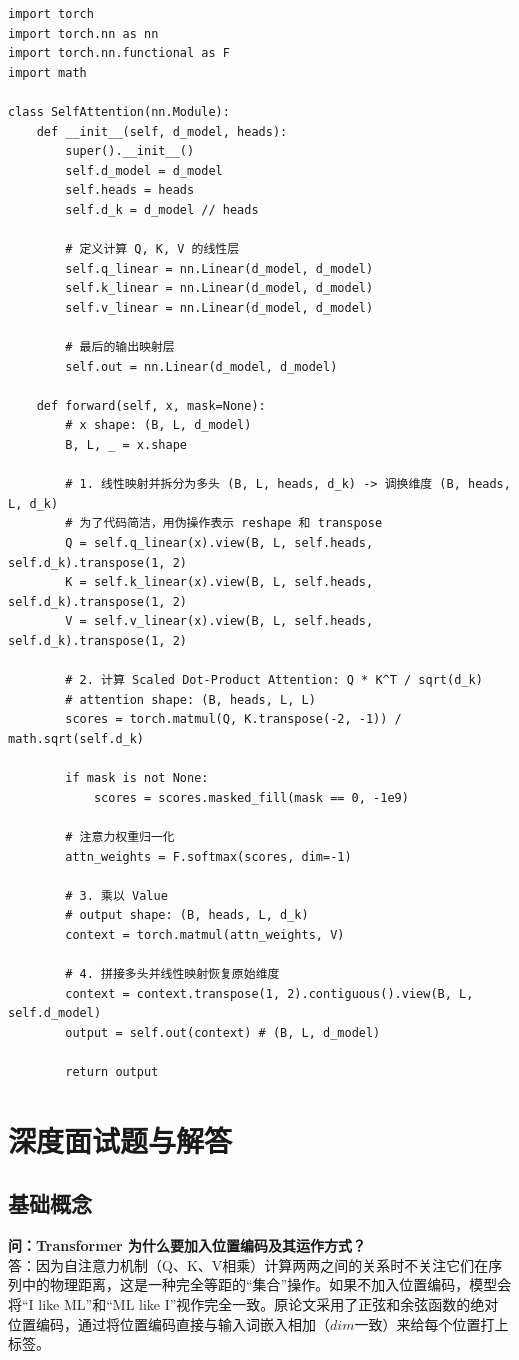 \documentclass[12pt, a4paper]{article}
\begin{document}
\begin{lstlisting}
import torch
import torch.nn as nn
import torch.nn.functional as F
import math

class SelfAttention(nn.Module):
    def __init__(self, d_model, heads):
        super().__init__()
        self.d_model = d_model
        self.heads = heads
        self.d_k = d_model // heads
        
        # 定义计算 Q, K, V 的线性层
        self.q_linear = nn.Linear(d_model, d_model)
        self.k_linear = nn.Linear(d_model, d_model)
        self.v_linear = nn.Linear(d_model, d_model)
        
        # 最后的输出映射层
        self.out = nn.Linear(d_model, d_model)
        
    def forward(self, x, mask=None):
        # x shape: (B, L, d_model)
        B, L, _ = x.shape
        
        # 1. 线性映射并拆分为多头 (B, L, heads, d_k) -> 调换维度 (B, heads, L, d_k)
        # 为了代码简洁，用伪操作表示 reshape 和 transpose
        Q = self.q_linear(x).view(B, L, self.heads, self.d_k).transpose(1, 2)
        K = self.k_linear(x).view(B, L, self.heads, self.d_k).transpose(1, 2)
        V = self.v_linear(x).view(B, L, self.heads, self.d_k).transpose(1, 2)
        
        # 2. 计算 Scaled Dot-Product Attention: Q * K^T / sqrt(d_k)
        # attention shape: (B, heads, L, L)
        scores = torch.matmul(Q, K.transpose(-2, -1)) / math.sqrt(self.d_k)
        
        if mask is not None:
            scores = scores.masked_fill(mask == 0, -1e9)
            
        # 注意力权重归一化
        attn_weights = F.softmax(scores, dim=-1)
        
        # 3. 乘以 Value
        # output shape: (B, heads, L, d_k)
        context = torch.matmul(attn_weights, V)
        
        # 4. 拼接多头并线性映射恢复原始维度
        context = context.transpose(1, 2).contiguous().view(B, L, self.d_model)
        output = self.out(context) # (B, L, d_model)
        
        return output
\end{lstlisting}

\section{深度面试题与解答}
\subsection{基础概念}
\textbf{问：Transformer 为什么要加入位置编码及其运作方式？}\\
答：因为自注意力机制（Q、K、V相乘）计算两两之间的关系时不关注它们在序列中的物理距离，这是一种完全等距的“集合”操作。如果不加入位置编码，模型会将“I like ML”和“ML like I”视作完全一致。原论文采用了正弦和余弦函数的绝对位置编码，通过将位置编码直接与输入词嵌入相加（$dim$一致）来给每个位置打上标签。
\end{document}
